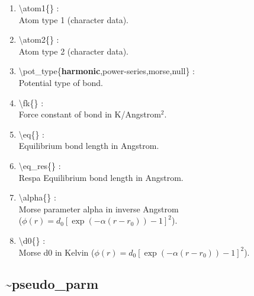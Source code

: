 \documentclass[12pt,titlepage]{article}
\begin{document}
\begin{enumerate}

 \vspace{0.15in} 
 \item  \textbackslash atom1\{\} : \\
    Atom type 1 (character data).
   
 \vspace{0.15in} 
 \item  \textbackslash atom2\{\} : \\ 
    Atom type 2 (character data).

 \vspace{0.15in} 
 \item  \textbackslash pot\_type\{{\bf harmonic},power-series,morse,null\} : \\
     Potential type of bond.

 \vspace{0.15in} 
 \item  \textbackslash fk\{\} : \\
     Force constant of bond in K/Angstrom$^2$.

 \vspace{0.15in} 
 \item  \textbackslash eq\{\} : \\
    Equilibrium bond length in Angstrom.

 \vspace{0.15in} 
 \item  \textbackslash eq\_res\{\} : \\
     Respa Equilibrium bond length in Angstrom.

 \vspace{0.15in} 
 \item  \textbackslash alpha\{\} : \\
    Morse parameter alpha in inverse Angstrom \\
    ($\phi(r) = d_0[\exp(-\alpha(r-r_0))-1]^2$).

 \vspace{0.15in} 
 \item  \textbackslash d0\{\} : \\
    Morse d0 in Kelvin
    ($\phi(r) = d_0[\exp(-\alpha(r-r_0))-1]^2$).

\end{enumerate}

\newpage
\subsection*{\bf \~{}pseudo\_parm}
\end{document}
